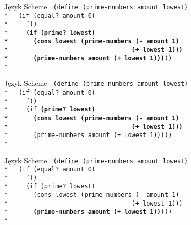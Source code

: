 \documentclass{beamer}
\begin{document}
\begin{frame}{Język Scheme}
  \texttt{
(define (prime-numbers amount lowest)\\*
\ \ (if (equal? amount 0)\\*
\ \ \ \ '()\\*
\ \ \ \ \textbf{(if (prime? lowest)\\*
\ \ \ \ \ \ (cons lowest (prime-numbers (- amount 1)\\*
\ \ \ \ \ \ \ \ \ \ \ \ \ \ \ \ \
\ \ \ \ \ \ \ \ \ \ \ \ \ \ \ \ (+ lowest 1)))\\*
\ \ \ \ \ \ (prime-numbers amount (+ lowest 1)))}))\\*
  }
\end{frame}

\begin{frame}{Język Scheme}
  \texttt{
(define (prime-numbers amount lowest)\\*
\ \ (if (equal? amount 0)\\*
\ \ \ \ '()\\*
\ \ \ \ (if \textbf{(prime? lowest)\\*
\ \ \ \ \ \ (cons lowest (prime-numbers (- amount 1)\\*
\ \ \ \ \ \ \ \ \ \ \ \ \ \ \ \ \
\ \ \ \ \ \ \ \ \ \ \ \ \ \ \ \ (+ lowest 1)))}\\*
\ \ \ \ \ \ (prime-numbers amount (+ lowest 1)))))\\*
  }
\end{frame}

\begin{frame}{Język Scheme}
  \texttt{
(define (prime-numbers amount lowest)\\*
\ \ (if (equal? amount 0)\\*
\ \ \ \ '()\\*
\ \ \ \ (if (prime? lowest)\\*
\ \ \ \ \ \ (cons lowest (prime-numbers (- amount 1)\\*
\ \ \ \ \ \ \ \ \ \ \ \ \ \ \ \ \
\ \ \ \ \ \ \ \ \ \ \ \ \ \ \ \ (+ lowest 1)))\\*
\ \ \ \ \ \ \textbf{(prime-numbers amount (+ lowest 1))})))\\*
  }
\end{frame}
\end{document}
